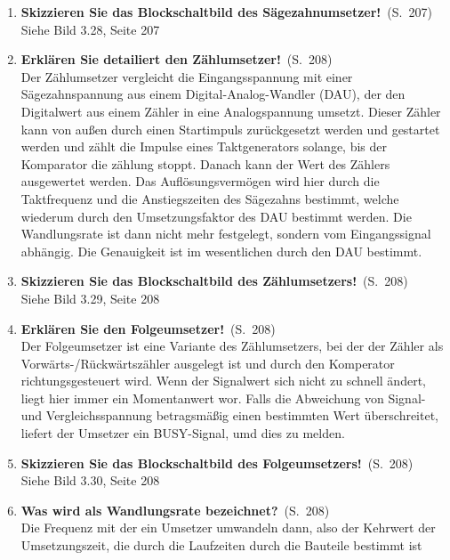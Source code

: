 \documentclass[a4paper,12pt]{article}
\newcommand{\question}[3]{\pagebreak[3]\item {\textbf{#1?}}\ (S.\ #2)#3}
\newcommand{\statement}[3]{\pagebreak[3]\item {\textbf{#1!}}\ (S.\ #2)#3}
\newcommand{\normaltext}[1]{\\#1}
\newcommand{\page}[1]{#1}
\begin{document}
\begin{enumerate}
  \statement{Skizzieren Sie das Blockschaltbild des Sägezahnumsetzer}{\page{207}}
  {
    \normaltext{Siehe Bild 3.28, Seite 207}
  }

  \statement{Erklären Sie detailiert den Zählumsetzer}{\page{208}}
  {
    \normaltext{Der Zählumsetzer vergleicht die Eingangsspannung mit einer Sägezahnspannung
                aus einem Digital-Analog-Wandler (DAU), der den Digitalwert aus einem Zähler
                in eine Analogspannung umsetzt. Dieser Zähler kann von außen durch einen
                Startimpuls zurückgesetzt werden und gestartet werden und zählt die Impulse
                eines Taktgenerators solange, bis der Komparator die zählung stoppt. Danach
                kann der Wert des Zählers ausgewertet werden. Das Auflösungsvermögen wird hier
                durch die Taktfrequenz und die Anstiegszeiten des Sägezahns bestimmt, welche
                wiederum durch den Umsetzungsfaktor des DAU bestimmt werden. Die Wandlungsrate
                ist dann nicht mehr festgelegt, sondern vom Eingangssignal abhängig. Die
                Genauigkeit ist im wesentlichen durch den DAU bestimmt.}
  }

  \statement{Skizzieren Sie das Blockschaltbild des Zählumsetzers} {\page{208}}
  {
    \normaltext{Siehe Bild 3.29, Seite 208}
  }

  \statement{Erklären Sie den Folgeumsetzer}{\page{208}}
  {
    \normaltext{Der Folgeumsetzer ist eine Variante des Zählumsetzers, bei der der Zähler als
                Vorwärts-/Rückwärtszähler ausgelegt ist und durch den Komperator richtungsgesteuert wird.
                Wenn der Signalwert sich nicht zu schnell ändert, liegt hier immer ein Momentanwert wor.
                Falls die Abweichung von Signal- und Vergleichsspannung betragsmäßig einen bestimmten Wert
                überschreitet, liefert der Umsetzer ein BUSY-Signal, umd dies zu melden.}
  }

  \statement{Skizzieren Sie das Blockschaltbild des Folgeumsetzers} {\page{208}}
  {
    \normaltext{Siehe Bild 3.30, Seite 208}
  }

  \question{Was wird als Wandlungsrate bezeichnet}{\page{208}}
  {
    \normaltext{Die Frequenz mit der ein Umsetzer umwandeln dann, also der Kehrwert der
                Umsetzungszeit, die durch die Laufzeiten durch die Bauteile bestimmt ist}
  }


\end{enumerate}
\end{document}
